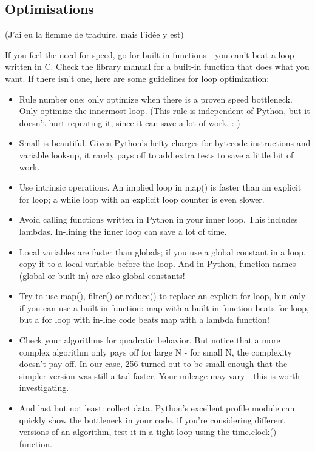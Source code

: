 \documentclass[a4paper,twoside]{article}
\begin{document}
\subsection{Optimisations}
(J'ai eu la flemme de traduire, mais l'idée y est)

If you feel the need for speed, go for built-in functions - you can't beat a loop written in C. Check the library manual for a built-in function that does what you want. If there isn't one, here are some guidelines for loop optimization:

\begin{itemize}
\item Rule number one: only optimize when there is a proven speed bottleneck. Only optimize the innermost loop. (This rule is independent of Python, but it doesn't hurt repeating it, since it can save a lot of work. :-)
\item Small is beautiful. Given Python's hefty charges for bytecode instructions and variable look-up, it rarely pays off to add extra tests to save a little bit of work.
\item Use intrinsic operations. An implied loop in map() is faster than an explicit for loop; a while loop with an explicit loop counter is even slower.
\item Avoid calling functions written in Python in your inner loop. This includes lambdas. In-lining the inner loop can save a lot of time.
\item Local variables are faster than globals; if you use a global constant in a loop, copy it to a local variable before the loop. And in Python, function names (global or built-in) are also global constants!
\item Try to use map(), filter() or reduce() to replace an explicit for loop, but only if you can use a built-in function: map with a built-in function beats for loop, but a for loop with in-line code beats map with a lambda function!
\item Check your algorithms for quadratic behavior. But notice that a more complex algorithm only pays off for large N - for small N, the complexity doesn't pay off. In our case, 256 turned out to be small enough that the simpler version was still a tad faster. Your mileage may vary - this is worth investigating.
\item And last but not least: collect data. Python's excellent profile module can quickly show the bottleneck in your code. if you're considering different versions of an algorithm, test it in a tight loop using the time.clock() function. 
\end{itemize}


\printindex
\end{document}
